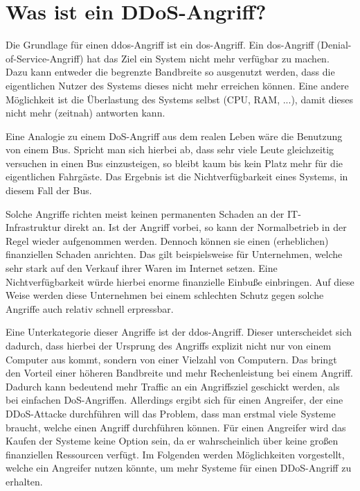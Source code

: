 \chapter{Was ist ein DDoS-Angriff?}
\label{chap:kapitel1}

Die Grundlage für einen \ac{ddos}-Angriff ist ein \ac{dos}-Angriff. Ein \ac{dos}-Angriff (Denial-of-Service-Angriff) hat das Ziel ein System nicht mehr verfügbar zu machen. Dazu kann entweder die begrenzte Bandbreite so ausgenutzt werden, dass die eigentlichen Nutzer des Systems dieses nicht mehr erreichen können. Eine andere Möglichkeit ist die Überlastung des Systems selbst (CPU, RAM, ...), damit dieses nicht mehr (zeitnah) antworten kann.

Eine Analogie zu einem DoS-Angriff aus dem realen Leben wäre die Benutzung von einem Bus. Spricht man sich hierbei ab, dass sehr viele Leute gleichzeitig versuchen in einen Bus einzusteigen, so bleibt kaum bis kein Platz mehr für die eigentlichen Fahrgäste. Das Ergebnis ist die Nichtverfügbarkeit eines Systems, in diesem Fall der Bus.

Solche Angriffe richten meist keinen permanenten Schaden an der IT-Infrastruktur direkt an. Ist der Angriff vorbei, so kann der Normalbetrieb in der Regel wieder aufgenommen werden. Dennoch können sie einen (erheblichen) finanziellen Schaden anrichten. Das gilt beispielsweise für Unternehmen, welche sehr stark auf den Verkauf ihrer Waren im Internet setzen. Eine Nichtverfügbarkeit würde hierbei enorme finanzielle Einbuße einbringen. Auf diese Weise werden diese Unternehmen bei einem schlechten Schutz gegen solche Angriffe auch relativ schnell erpressbar.

Eine Unterkategorie dieser Angriffe ist der \acl{ddos}-Angriff. Dieser unterscheidet sich dadurch, dass hierbei der Ursprung des Angriffs explizit nicht nur von einem Computer aus kommt, sondern von einer Vielzahl von Computern. Das bringt den Vorteil einer höheren Bandbreite und mehr Rechenleistung bei einem Angriff. Dadurch kann bedeutend mehr Traffic an ein Angriffsziel geschickt werden, als bei einfachen DoS-Angriffen. Allerdings ergibt sich für einen Angreifer, der eine DDoS-Attacke durchführen will das Problem, dass man erstmal viele Systeme braucht, welche einen Angriff durchführen können. Für einen Angreifer wird das Kaufen der Systeme keine Option sein, da er wahrscheinlich über keine großen finanziellen Ressourcen verfügt. Im Folgenden werden Möglichkeiten vorgestellt, welche ein Angreifer nutzen könnte, um mehr Systeme für einen DDoS-Angriff zu erhalten. 

